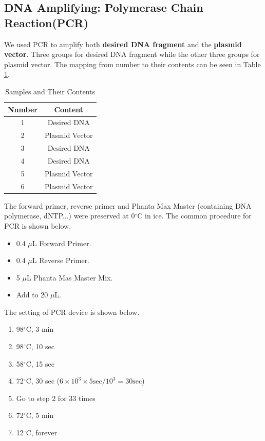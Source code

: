 \documentclass{article}
\begin{document}
\subsection{DNA Amplifying: Polymerase Chain Reaction(PCR)}
We used PCR to amplify both \textbf{desired DNA fragment} and the \textbf{plasmid vector}. Three groups for desired DNA fragment while the other three groups for plasmid vector. The mapping from number to their contents can be seen in Table \ref{Samples and Their Contents}.
\begin{table}
    \centering
    \begin{tabular}{|c|c|} \hline 
         Number& Content\\ \hline 
         1& Desired DNA\\ \hline 
         2& Plasmid Vector\\ \hline 
         3& Desired DNA\\ \hline 
         4& Desired DNA\\ \hline 
         5& Plasmid Vector\\ \hline 
         6& Plasmid Vector\\ \hline
    \end{tabular}
    \caption{Samples and Their Contents}
    \label{Samples and Their Contents}
\end{table}
The forward primer, reverse primer and Phanta Max Master (containing DNA polymerase, dNTP...) were preserved at 0$^\circ$C in ice. The common procedure for PCR is shown below.
\begin{itemize}
    \item 0.4 $\mu$L Forward Primer.
    \item 0.4 $\mu$L Reverse Primer.
    \item 5 $\mu$L Phanta Mas Master Mix.
    \item Add  to 20 $\mu$L.

\end{itemize}
The setting of PCR device is shown below.
\begin{enumerate}
    \item 98$^\circ$C, 3 min
    \item 98$^\circ$C, 10 sec
    \item 58$^\circ$C, 15 sec
    \item 72$^\circ$C,  30 sec      ($6\times 10 ^3 \times 5 \mathrm{sec}/10^3 = 30 \mathrm{sec}$)
    \item Go to step 2 for 33 times
    \item 72$^\circ$C, 5 min
    \item 12$^\circ$C, forever
\end{enumerate}
\end{document}
